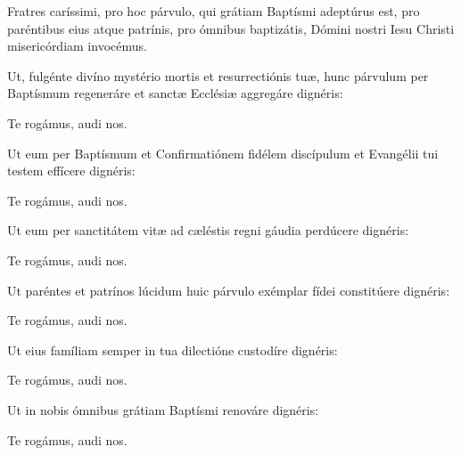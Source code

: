  Fratres caríssimi, pro hoc párvulo, qui grátiam Baptísmi
adeptúrus est, pro paréntibus eius atque patrínis, pro ómnibus baptizátis,
Dómini nostri Iesu Christi mi\-se\-ri\-cór\-di\-am invocémus.

 Ut, fulgénte divíno mystério mortis et resurrectiónis tuæ,
hunc párvulum per Baptísmum regeneráre et sanctæ Ecclésiæ aggregáre
dignéris:

 Te rogámus, audi nos.

 Ut eum per Baptísmum et Confirmatiónem fidélem
discípulum et Evangélii tui testem effícere dignéris:

 Te rogámus, audi nos.

 Ut eum per sanctitátem vitæ ad cæléstis regni gáudia
perdúcere dignéris:

 Te rogámus, audi nos.

 Ut paréntes et patrínos lúcidum huic párvulo exémplar
fídei constitúere dignéris:

 Te rogámus, audi nos.

 Ut eius famíliam semper in tua dilectióne custodíre
dignéris:

 Te rogámus, audi nos.

 Ut in nobis ómnibus grátiam Baptísmi renováre dignéris:

 Te rogámus, audi nos.
